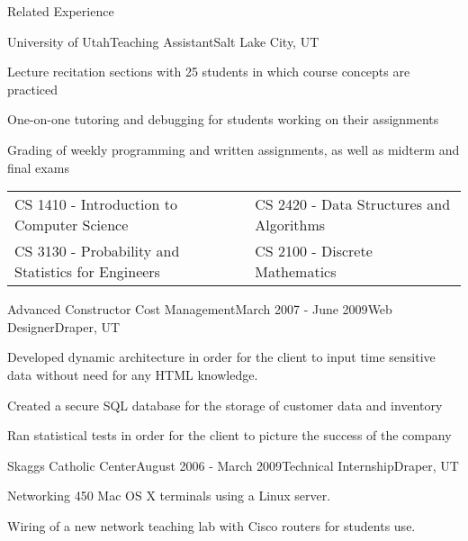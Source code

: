 \documentclass{resume}
\begin{document}
\begin{relatedExperience}
\begin{rSection}{Related Experience}

\begin{experienceTA}
\begin{rSubsection}{University of Utah}{}{Teaching Assistant}{Salt Lake City, UT}
\item Lecture recitation sections with 25 students in which course concepts are practiced
\item One-on-one tutoring and debugging for students working on their assignments
\item Grading of weekly programming and written assignments, as well as midterm and final exams
\\
\begin{tabularx}{\textwidth}{ l l }
CS 1410 - Introduction to Computer Science & CS 2420 - Data Structures and Algorithms \\
CS 3130 - Probability and Statistics for Engineers & CS 2100 - Discrete Mathematics \\
\end{tabularx}
\end{rSubsection}
\end{experienceTA}


\begin{experienceACCM}
\begin{rSubsection}{Advanced Constructor Cost Management}{March 2007 - June 2009}{Web Designer}{Draper, UT}
\item Developed dynamic architecture in order for the client to input time sensitive data without need for any HTML knowledge.
\item Created a secure SQL database for the storage of customer data and inventory
\item Ran statistical tests in order for the client to picture the success of the company
\end{rSubsection}
\end{experienceACCM}


\begin{experienceJdIntern}
\begin{rSubsection}{Skaggs Catholic Center}{August 2006 - March 2009}{Technical Internship}{Draper, UT}
\item Networking 450 Mac OS X terminals using a Linux server.
\item Wiring of a new network teaching lab with Cisco routers for students use.
\end{rSubsection}
\end{experienceJdIntern}

\end{rSection}
\end{relatedExperience}
\end{document}
